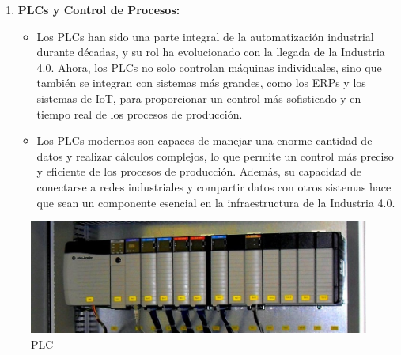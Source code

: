 \documentclass[
  10pt,
  letterpaper,
]{book}
\providecommand{\tightlist}{%
  \setlength{\itemsep}{0pt}\setlength{\parskip}{0pt}}\usepackage{longtable,booktabs,array}
\begin{document}
\begin{enumerate}
\def\labelenumi{\arabic{enumi}.}
\setcounter{enumi}{1}
\tightlist
\item
  \textbf{PLCs y Control de Procesos:}

  \begin{itemize}
  \tightlist
  \item
    Los PLCs han sido una parte integral de la automatización industrial
    durante décadas, y su rol ha evolucionado con la llegada de la
    Industria 4.0. Ahora, los PLCs no solo controlan máquinas
    individuales, sino que también se integran con sistemas más grandes,
    como los ERPs y los sistemas de IoT, para proporcionar un control
    más sofisticado y en tiempo real de los procesos de producción.
  \item
    Los PLCs modernos son capaces de manejar una enorme cantidad de
    datos y realizar cálculos complejos, lo que permite un control más
    preciso y eficiente de los procesos de producción. Además, su
    capacidad de conectarse a redes industriales y compartir datos con
    otros sistemas hace que sean un componente esencial en la
    infraestructura de la Industria 4.0.
  \end{itemize}
\end{enumerate}

\begin{figure}[H]

{\centering \includegraphics{Img/plc.jpg}

}

\caption{PLC}

\end{figure}%
\end{document}

